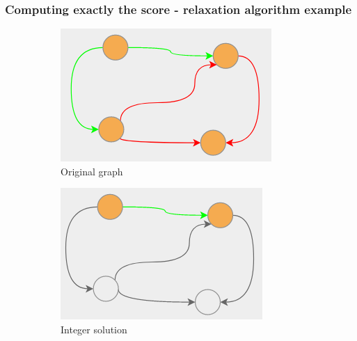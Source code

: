\documentclass{beamer}
\begin{document}
\begin{frame}[c]
	\frametitle{Computing exactly the score - relaxation algorithm example}
	\begin{figure}
		\begin{center}
			\begin{subfigure}[b]{0.3\textwidth}
				\centering
				\includegraphics[width=\textwidth]{img/graph-example2-1.png}
				\caption{Original graph}
				\label{fig:img/graph-example2-1.png}
			\end{subfigure}
			\begin{subfigure}[b]{0.3\textwidth}
				\centering
				\includegraphics[width=\textwidth]{img/graph-example2-2.png}
				\caption{Integer solution}
				\label{fig:img/graph-example2-2.png}
			\end{subfigure}
			\begin{subfigure}[b]{0.3\textwidth}
				\centering

\end{subfigure}
\end{center}
\end{figure}
\end{frame}
\end{document}
